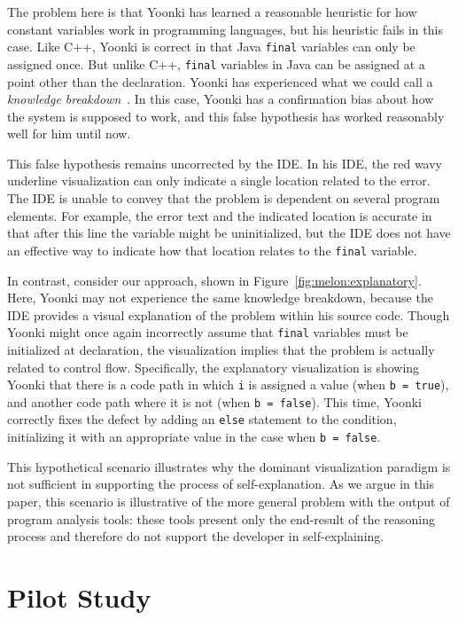 \documentclass[conference]{IEEEtran}
\begin{document}
The problem here is that Yoonki has learned a reasonable heuristic for how constant variables work in programming languages, but his heuristic fails in this case. Like C++, Yoonki is correct in that Java \texttt{final} variables can only be assigned once. But unlike C++, \texttt{final} variables in Java can be assigned at a point other than the declaration. Yoonki has experienced what we could call a \textit{knowledge breakdown}~\cite{Ko2005}. In this case, Yoonki has a confirmation bias about how the system is supposed to work, and this false hypothesis has worked reasonably well for him until now.

This false hypothesis remains uncorrected by the IDE. In his IDE, the red wavy underline visualization can only indicate a single location related to the error. The IDE is unable to convey that the problem is dependent on several program elements. For example, the error text and the indicated location is accurate in that after this line the variable might be uninitialized, but the IDE does not have an effective way to indicate how that location relates to the \texttt{final} variable.

In contrast, consider our approach, shown in Figure~\ref{fig:melon:explanatory}. Here, Yoonki may not experience the same knowledge breakdown, because the IDE provides a visual explanation of the problem within his source code. Though Yoonki might once again incorrectly assume that \texttt{final} variables must be initialized at declaration, the visualization implies that the problem is actually related to control flow. Specifically, the explanatory visualization is showing Yoonki that there is a code path in which \texttt{i} is assigned a value (when \texttt{b = true}), and another code path where it is not (when \texttt{b = false}). This time, Yoonki correctly fixes the defect by adding an \texttt{else} statement to the condition, initializing it with an appropriate value in the case when \texttt{b = false}.

This hypothetical scenario illustrates why the dominant visualization paradigm is not sufficient in supporting the process of self-explanation. As we argue in this paper, this scenario is illustrative of the more general problem with the output of program analysis tools: these tools present only the end-result of the reasoning process and therefore do not support the developer in self-explaining.

\section{Pilot Study}
\label{sec:pilotstudy}
\end{document}
